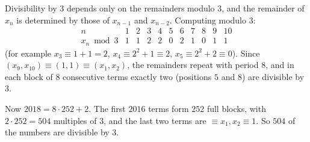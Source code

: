 Divisibility by $3$ depends only on the remainders modulo $3$, and the remainder of $x_n$ is determined by those of $x_{n-1}$ and $x_{n-2}$. Computing modulo $3$:
\[\begin{array}{c|cccccccccc}
n&1&2&3&4&5&6&7&8&9&10\\\hline
x_n\bmod3&1&1&2&2&0&2&1&0&1&1
\end{array}\]
(for example $x_3\equiv1+1=2$, $x_4\equiv2^2+1\equiv2$, $x_5\equiv2^2+2\equiv0$). Since $(x_9,x_{10})\equiv(1,1)\equiv(x_1,x_2)$, the remainders repeat with period $8$, and in each block of $8$ consecutive terms exactly two (positions $5$ and $8$) are divisible by $3$.

Now $2018=8\cdot252+2$. The first $2016$ terms form $252$ full blocks, with $2\cdot252=504$ multiples of $3$, and the last two terms are $\equiv x_1,x_2\equiv1$. So $\boxed{504}$ of the numbers are divisible by $3$.
